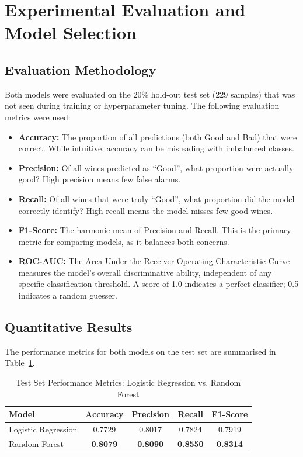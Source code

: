 \documentclass[11pt,a4paper]{article}
\begin{document}
\section{Experimental Evaluation and Model Selection}

\subsection{Evaluation Methodology}

Both models were evaluated on the 20\% hold-out test set (229 samples) that was not seen during training or hyperparameter tuning. The following evaluation metrics were used:

\begin{itemize}
    \item \textbf{Accuracy:} The proportion of all predictions (both Good and Bad) that were correct. While intuitive, accuracy can be misleading with imbalanced classes.
    \item \textbf{Precision:} Of all wines predicted as ``Good'', what proportion were actually good? High precision means few false alarms.
    \item \textbf{Recall:} Of all wines that were truly ``Good'', what proportion did the model correctly identify? High recall means the model misses few good wines.
    \item \textbf{F1-Score:} The harmonic mean of Precision and Recall. This is the primary metric for comparing models, as it balances both concerns.
    \item \textbf{ROC-AUC:} The Area Under the Receiver Operating Characteristic Curve measures the model's overall discriminative ability, independent of any specific classification threshold. A score of 1.0 indicates a perfect classifier; 0.5 indicates a random guesser.
\end{itemize}

\subsection{Quantitative Results}

The performance metrics for both models on the test set are summarised in Table~\ref{tab:results}.

\begin{table}[H]
    \centering
    \caption{Test Set Performance Metrics: Logistic Regression vs. Random Forest}
    \label{tab:results}
    \begin{tabular}{lcccc}
        \toprule
        \textbf{Model} & \textbf{Accuracy} & \textbf{Precision} & \textbf{Recall} & \textbf{F1-Score} \\
        \midrule
        Logistic Regression & 0.7729 & 0.8017 & 0.7824 & 0.7919 \\
        Random Forest       & \textbf{0.8079} & \textbf{0.8090} & \textbf{0.8550} & \textbf{0.8314} \\
        \bottomrule
    \end{tabular}
\end{table}
\end{document}
